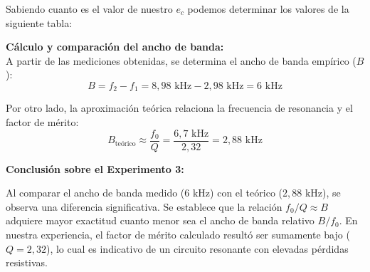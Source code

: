 Sabiendo cuanto es el valor de nuestro $e_{c}$  podemos determinar los valores de la siguiente tabla:

\begin{table}[H]
\end{table}


\textbf{Cálculo y comparación del ancho de banda:}\\
A partir de las mediciones obtenidas, se determina el ancho de banda empírico ($B$):
\begin{equation*}
    B = f_2 - f_1 = 8,98 \text{ kHz} - 2,98 \text{ kHz} = 6 \text{ kHz}
\end{equation*}

Por otro lado, la aproximación teórica relaciona la frecuencia de resonancia y el factor de mérito:
\begin{equation*}
    B_{\text{teórico}} \approx \frac{f_0}{Q} = \frac{6,7 \text{ kHz}}{2,32} = 2,88 \text{ kHz}
\end{equation*}

\vspace{0.5cm}
\noindent
\textbf{Conclusión sobre el Experimento 3:}

Al comparar el ancho de banda medido ($6 \text{ kHz}$) con el teórico ($2,88 \text{ kHz}$), se observa una diferencia significativa. Se establece que la relación $f_0 / Q \approx B$ adquiere mayor exactitud cuanto menor sea el ancho de banda relativo $B/f_0$. En nuestra experiencia, el factor de mérito calculado resultó ser sumamente bajo ($Q = 2,32$), lo cual es indicativo de un circuito resonante con elevadas pérdidas resistivas. 



